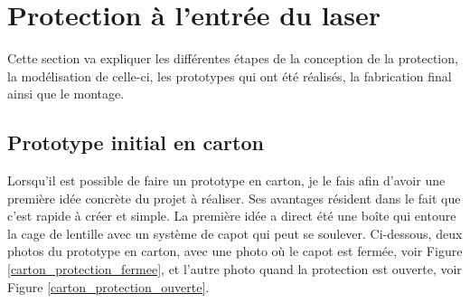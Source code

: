 \section{Protection à l'entrée du laser}
Cette section va expliquer les différentes étapes de la conception de la protection, la modélisation de celle-ci, les prototypes qui ont été réalisés, la fabrication final ainsi que le montage.
\subsection{Prototype initial en carton}
Lorsqu'il est possible de faire un prototype en carton, je le fais afin d'avoir une première idée concrète du projet à réaliser. Ses avantages résident dans le fait que c'est rapide à créer et simple. La première idée a direct été une boîte qui entoure la cage de lentille avec un système de capot qui peut se soulever. Ci-dessous, deux photos du prototype en carton, avec une photo où le capot est fermée, voir Figure \ref{carton_protection_fermee}, et l'autre photo quand la protection est ouverte, voir Figure \ref{carton_protection_ouverte}.

